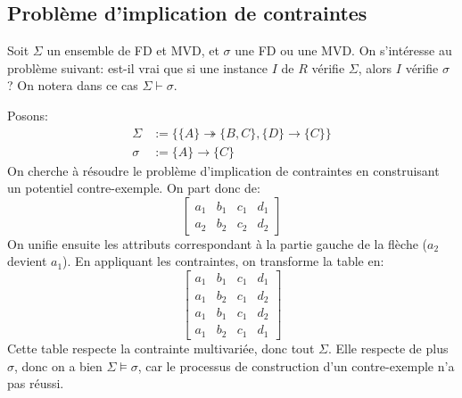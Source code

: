 \documentclass[french, toc]{../cs-classes/cs-classes}
\begin{document}
\subsection{Problème d'implication de contraintes}
Soit $\Sigma$ un ensemble de FD et MVD, et $\sigma$ une FD ou une MVD. On s'intéresse au problème suivant: est-il vrai que si une instance $I$ de $R$ vérifie $\Sigma$, alors $I$ vérifie $\sigma$ ? On notera dans ce cas $\Sigma \vdash \sigma$.

\begin{exemple}
    Posons:
    \begin{equation*}
        \begin{aligned}
            \Sigma &:= \{\{A\}\twoheadrightarrow\{B, C\}, \{D\}\rightarrow\{C\}\}\\
            \sigma &:= \{A\} \rightarrow \{C\}
        \end{aligned}
    \end{equation*}
    On cherche à résoudre le problème d'implication de contraintes en construisant un potentiel contre-exemple. On part donc de:
    \begin{equation*}
        \begin{bmatrix}
            a_1&b_1&c_1&d_1\\
            a_2&b_2&c_2&d_2
        \end{bmatrix}
    \end{equation*}
    On unifie ensuite les attributs correspondant à la partie gauche de la flèche ($a_2$ devient $a_1$). En appliquant les contraintes, on transforme la table en:
    \begin{equation*}
        \begin{bmatrix}
            a_1&b_1&c_1&d_1\\
            a_1&b_2&c_1&d_2\\
            a_1&b_1&c_1&d_2\\
            a_1&b_2&c_1&d_1
        \end{bmatrix}
    \end{equation*}
    Cette table respecte la contrainte multivariée, donc tout $\Sigma$. Elle respecte de plus $\sigma$, donc on a bien $\Sigma\vDash\sigma$, car le processus de construction d'un contre-exemple n'a pas réussi.
\end{exemple}
\end{document}
